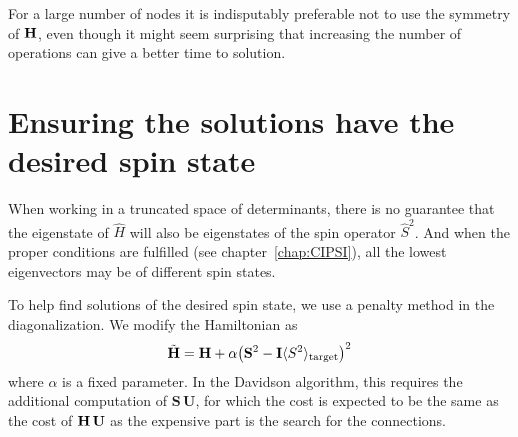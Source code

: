 \documentclass[./thesis.tex]{subfiles}
\begin{document}
For a large number of nodes it is indisputably preferable not to use the
symmetry of $\mathbf{H}$, even though it might seem surprising that increasing the
number of operations can give a better time to solution.

%
%



\section{Ensuring the solutions have the desired spin state}

When working in a truncated space of determinants, there is no guarantee that the eigenstate of $\hat H$ will also be eigenstates of the spin operator $\hat S^2$. And when the proper conditions are fulfilled (see chapter~\ref{chap:CIPSI}), all the lowest eigenvectors may be of different spin states.

To help find solutions of the desired spin state, we use a penalty method in the diagonalization.\cite{Fales2017Sep} We modify the Hamiltonian as 
\newcommand{\mS}{\mathbf{S}}
\newcommand{\mU}{\mathbf{U}}
\begin{equation}
\tilde{\mH} = \mH + \alpha \qty( \mS^2 - \mathbf{I} \langle S^2 \rangle_\text{target} )^2
\end{equation}
where $\alpha$ is a fixed parameter.
In the Davidson algorithm, this requires the additional computation of $\mS\, \mU$, for which the
cost is expected to be the same as the cost of $\mH \, \mU$ as the expensive part is the search for the
connections.
\end{document}
